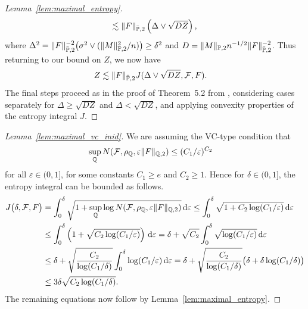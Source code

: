 \begin{proof}[Lemma~\ref{lem:maximal_entropy}]
\begin{align*}
    \lesssim
    \|F\|_{\bar\P,2}
    \left( \Delta \vee \sqrt{DZ} \right),
  \end{align*}
  where
  $\Delta^2 = \|F\|_{\bar\P,2}^{-2}
  \big(\sigma^2 \vee (\|M\|_{\P,2}^2 / n) \big) \geq \delta^2$
  and
  $D = \|M\|_{\P,2} n^{-1/2} \|F\|_{\bar\P,2}^{-2}$.
  Thus returning to our bound on $Z$,
  we now have
  \begin{align*}
    Z
    &\lesssim
    \|F\|_{\bar\P,2}
    J(\Delta \vee \sqrt{DZ}, \cF, F).
  \end{align*}
  The final steps proceed as
  in the proof of Theorem~5.2
  from \citet{chernozhukov2014gaussian},
  considering cases separately for
  $\Delta \geq \sqrt{DZ}$
  and
  $\Delta < \sqrt{DZ}$,
  and applying convexity properties of
  the entropy integral $J$.
\end{proof}

\begin{proof}[Lemma~\ref{lem:maximal_vc_inid}]

  We are assuming the VC-type condition that
  \begin{align*}
    \sup_\Q N(\cF, \rho_\Q, \varepsilon \|F\|_{\Q,2})
    &\leq
    (C_1/\varepsilon)^{C_2}
  \end{align*}
  for all $\varepsilon \in (0,1]$,
  for some constants
  $C_1 \geq e$
  and $C_2 \geq 1$.
  Hence for $\delta \in (0,1]$,
  the entropy integral can be bounded as follows.
  \begin{align*}
    J\big(\delta, \cF, F\big)
    &=
    \int_0^\delta
    \sqrt{1 +
    \sup_\Q \log N(\cF, \rho_\Q, \varepsilon \|F\|_{\Q,2})}
    \diff{\varepsilon}
    \leq
    \int_0^\delta
    \sqrt{1 +
    C_2 \log (C_1/\varepsilon)}
    \diff{\varepsilon} \\
    &\leq
    \int_0^\delta
    \left(
      1 +
      \sqrt{C_2 \log (C_1/\varepsilon)}
    \right)
    \diff{\varepsilon}
    =
    \delta
    + \sqrt{C_2}
    \int_0^\delta
    \sqrt{\log (C_1/\varepsilon)}
    \diff{\varepsilon} \\
    &\leq
    \delta
    + \sqrt{\frac{C_2}{\log (C_1/\delta)}}
    \int_0^\delta
    \log (C_1/\varepsilon)
    \diff{\varepsilon}
    =
    \delta
    + \sqrt{\frac{C_2}{\log (C_1/\delta)}}
    \big(
      \delta
      + \delta \log (C_1/\delta)
    \big) \\
    &\leq
    3 \delta
    \sqrt{C_2 \log (C_1/\delta)}.
  \end{align*}
  The remaining equations now follow
  by Lemma~\ref{lem:maximal_entropy}.
\end{proof}


